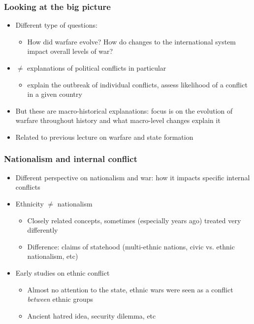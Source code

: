 \documentclass[aspectratio=43]{beamer}
\begin{document}
\begin{frame}
\frametitle{Looking at the big picture}
\centering

\begin{itemize}
  \item Different type of questions:
  \begin{itemize}
    \item How did warfare evolve? How do changes to the international system impact overall levels of war?
  \end{itemize}
  \item $\neq$ explanations of political conflicts in particular
  \begin{itemize}
    \item explain the outbreak of individual conflicts, assess likelihood of a conflict in a given country
  \end{itemize}
  \item But these are macro-historical explanations: focus is on the evolution of warfare throughout history and what macro-level changes explain it
  \item Related to previous lecture on warfare and state formation
\end{itemize}

\end{frame}

\begin{frame}
\frametitle{Nationalism and internal conflict}
\centering

\begin{itemize}[<+->]
  \item Different perspective on nationalism and war: how it impacts specific internal conflicts
  \item Ethnicity $\neq$ nationalism
  \begin{itemize}
    \item Closely related concepts, sometimes (especially years ago) treated very differently
    \item Difference: claims of statehood (multi-ethnic nations, civic vs. ethnic nationalism, etc)
  \end{itemize}
  \item Early studies on ethnic conflict
  \begin{itemize}
    \item Almost no attention to the state, ethnic wars were seen as a conflict \textit{between} ethnic groups
    \item Ancient hatred idea, security dilemma, etc
  \end{itemize}
\end{itemize}

\end{frame}
\end{document}

